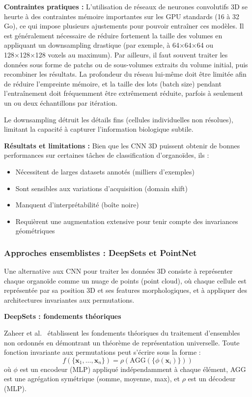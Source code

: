 \textbf{Contraintes pratiques :}
L’utilisation de réseaux de neurones convolutifs 3D se heurte à des contraintes mémoire importantes sur les GPU standards (16 à 32 Go), ce qui impose plusieurs ajustements pour pouvoir entraîner ces modèles. Il est généralement nécessaire de réduire fortement la taille des volumes en appliquant un downsampling drastique (par exemple, à 64×64×64 ou 128×128×128 voxels au maximum). Par ailleurs, il faut souvent traiter les données sous forme de patchs ou de sous-volumes extraits du volume initial, puis recombiner les résultats. La profondeur du réseau lui-même doit être limitée afin de réduire l’empreinte mémoire, et la taille des lots (batch size) pendant l’entraînement doit fréquemment être extrêmement réduite, parfois à seulement un ou deux échantillons par itération.

Le downsampling détruit les détails fins (cellules individuelles non résolues), limitant la capacité à capturer l'information biologique subtile.

\textbf{Résultats et limitations :}
Bien que les CNN 3D puissent obtenir de bonnes performances sur certaines tâches de classification d'organoïdes, ils :
\begin{itemize}
    \item Nécessitent de larges datasets annotés (milliers d'exemples)
    \item Sont sensibles aux variations d'acquisition (domain shift)
    \item Manquent d'interprétabilité (boîte noire)
    \item Requièrent une augmentation extensive pour tenir compte des invariances géométriques
\end{itemize}

\subsubsection{Approches ensemblistes : DeepSets et PointNet}

Une alternative aux CNN pour traiter les données 3D consiste à représenter chaque organoïde comme un nuage de points (point cloud), où chaque cellule est représentée par sa position 3D et ses features morphologiques, et à appliquer des architectures invariantes aux permutations.

\textbf{DeepSets : fondements théoriques}

Zaheer et al.~\cite{Zaheer2017} établissent les fondements théoriques du traitement d'ensembles non ordonnés en démontrant un théorème de représentation universelle. Toute fonction invariante aux permutations peut s'écrire sous la forme :
\[
f(\{\mathbf{x}_1, \ldots, \mathbf{x}_n\}) = \rho\left(\text{AGG}\left(\{\phi(\mathbf{x}_i)\}\right)\right)
\]
où $\phi$ est un encodeur (MLP) appliqué indépendamment à chaque élément, AGG est une agrégation symétrique (somme, moyenne, max), et $\rho$ est un décodeur (MLP).

